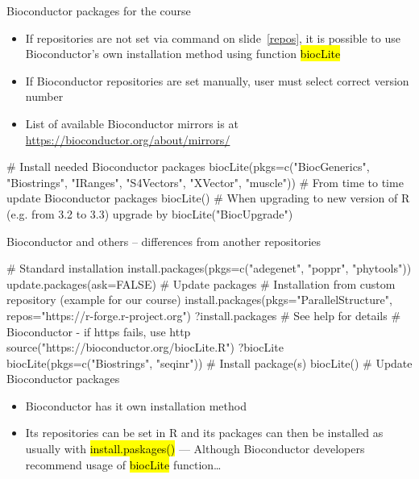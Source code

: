 \documentclass[compress, ucs, xelatex, 11pt, xcolor=svgnames,
  hyperref={
    bookmarks=true,
    unicode=true,
    colorlinks=true,
    pdftitle={Molecular data in R},
    plainpages=false,
    pdfauthor={Vojtech Zeisek},
    pdfsubject={Course about phylogeny and evolution in R},
    pdfcreator={XeLaTeX},
    pdfkeywords={R, evolution, phylogeny, molecular data},
    linkcolor=Tomato,
    anchorcolor=SaddleBrown,
    citecolor=Goldenrod,
    filecolor=DarkMagenta,
    menucolor=Sienna,
    urlcolor=DarkTurquoise,
    pdftex},
  url={hyphens, lowtilde} %
  ]{beamer}
\renewcommand{\texttt}[1]{\hl{\ttfamily #1}}
\begin{document}
\begin{frame}[fragile]{Bioconductor packages for the course}
  \begin{itemize}
    \item If repositories are not set via command on slide~\ref{repos}, it is possible to use Bioconductor's own installation method using function \texttt{biocLite}
    \item If Bioconductor repositories are set manually, user must select correct version number
    \item List of available Bioconductor mirrors is at \url{https://bioconductor.org/about/mirrors/}%
  \end{itemize}
  \begin{spluscode}
    # Install needed Bioconductor packages
    biocLite(pkgs=c("BiocGenerics", "Biostrings", "IRanges", "S4Vectors",
      "XVector", "muscle"))
    # From time to time update Bioconductor packages
    biocLite()
    # When upgrading to new version of R (e.g. from 3.2 to 3.3) upgrade by
    biocLite("BiocUpgrade")
  \end{spluscode}
\end{frame}

\begin{frame}[fragile]{Bioconductor and others -- differences from another repositories}
  \label{sources-diff}
  \begin{spluscode}
    # Standard installation
    install.packages(pkgs=c("adegenet", "poppr", "phytools"))
    update.packages(ask=FALSE) # Update packages
    # Installation from custom repository (example for our course)
    install.packages(pkgs="ParallelStructure",
      repos="https://r-forge.r-project.org")
    ?install.packages # See help for details
    # Bioconductor - if https fails, use http
    source("https://bioconductor.org/biocLite.R")
    ?biocLite
    biocLite(pkgs=c("Biostrings", "seqinr")) # Install package(s)
    biocLite() # Update Bioconductor packages
  \end{spluscode}
  \begin{itemize}
    \item Bioconductor has it own installation method
    \item Its repositories can be set in R and its packages can then be installed as usually with \texttt{install.paskages()} --- Although Bioconductor developers recommend usage of \texttt{biocLite} function\ldots
  \end{itemize}
\end{frame}
\end{document}
